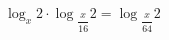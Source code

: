 \begin{ex}[type=equation]
	\begin{condition}
		$\log_x 2\cdot\log$\tiny$_{\dfrac{x}{16}}$\normalsize$2 =\log$\tiny$_{\dfrac{x}{64}}$\normalsize$2$
	\end{condition}
\end{ex}